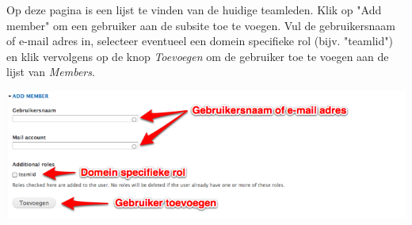 \bigskip
Op deze pagina is een lijst te vinden van de huidige teamleden.
Klik op "Add member" om een gebruiker aan de subsite toe te voegen.
Vul de gebruikersnaam of e-mail adres in, selecteer eventueel een domein specifieke rol (bijv. "teamlid") en klik vervolgens op de knop \emph{Toevoegen} om de gebruiker toe te voegen aan de lijst van \emph{Members}.

\bigskip

\begin{center}
	\includegraphics[width=\textwidth]{img/dominion4.png}
\end{center}
